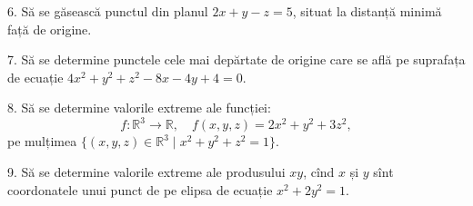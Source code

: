 \documentclass[11pt,a4paper]{article}
\newcommand\RR{\mathbb{R}}
\theoremstyle{dotless}
\theoremstyle{dotlessdr}
\begin{document}
\vspace{1cm}

6. Să se găsească punctul din planul $2x + y - z = 5$, situat la distanță minimă
față de origine.

\vspace{1cm}

7. Să se determine punctele cele mai depărtate de origine care se află pe
suprafața de ecuație $4x^2 + y^2 + z^2 - 8x - 4y + 4 = 0$.

\vspace{1cm}

8. Să se determine valorile extreme ale funcției:
\[
  f: \RR^3 \to \RR, \quad f(x, y, z) = 2x^2 + y^2 + 3z^2,
\]
pe mulțimea $\{(x, y, z) \in \RR^3 \mid x^2 + y^2 + z^2 = 1 \}$.

\vspace{1cm}

9. Să se determine valorile extreme ale produsului $xy$, cînd $x$ și $y$ sînt
coordonatele unui punct de pe elipsa de ecuație $x^2 + 2y^2 = 1$.
\end{document}
